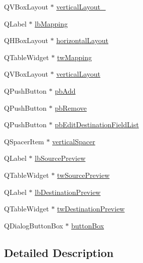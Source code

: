 \begin{DoxyCompactItemize}
\item 
Q\-V\-Box\-Layout $\ast$ \hyperlink{class_ui__mdt_field_map_dialog_ab02cee4966f301ecab7203d21905f62a}{vertical\-Layout\-\_}
\item 
Q\-Label $\ast$ \hyperlink{class_ui__mdt_field_map_dialog_aa508b425116eee11931533fb4ec7dace}{lb\-Mapping}
\item 
Q\-H\-Box\-Layout $\ast$ \hyperlink{class_ui__mdt_field_map_dialog_a833e4295c9d781adce6def558096f53d}{horizontal\-Layout}
\item 
Q\-Table\-Widget $\ast$ \hyperlink{class_ui__mdt_field_map_dialog_a75ba0e1cbf124fb09f2e0d4e90f33c27}{tw\-Mapping}
\item 
Q\-V\-Box\-Layout $\ast$ \hyperlink{class_ui__mdt_field_map_dialog_a126ba01f2e1767c734682486db335960}{vertical\-Layout}
\item 
Q\-Push\-Button $\ast$ \hyperlink{class_ui__mdt_field_map_dialog_a238f1b5debc76c3fff63e7a2b8c543d9}{pb\-Add}
\item 
Q\-Push\-Button $\ast$ \hyperlink{class_ui__mdt_field_map_dialog_a174e6dabe905ab4d0b45a24fd408ad20}{pb\-Remove}
\item 
Q\-Push\-Button $\ast$ \hyperlink{class_ui__mdt_field_map_dialog_aff6b12a8a09b3381c7910ed0d7a8e73b}{pb\-Edit\-Destination\-Field\-List}
\item 
Q\-Spacer\-Item $\ast$ \hyperlink{class_ui__mdt_field_map_dialog_a0e77e0b333f2ba3b75e1661b44c44b58}{vertical\-Spacer}
\item 
Q\-Label $\ast$ \hyperlink{class_ui__mdt_field_map_dialog_a3248ea0ebd503efd35f27776d92fc78a}{lb\-Source\-Preview}
\item 
Q\-Table\-Widget $\ast$ \hyperlink{class_ui__mdt_field_map_dialog_a4359b329034b12ab48019d873f1176f0}{tw\-Source\-Preview}
\item 
Q\-Label $\ast$ \hyperlink{class_ui__mdt_field_map_dialog_aba3f44c01ed87ecf11f384c29d20bf65}{lb\-Destination\-Preview}
\item 
Q\-Table\-Widget $\ast$ \hyperlink{class_ui__mdt_field_map_dialog_afe906fa26ad8f24ee89ddca43d00dcce}{tw\-Destination\-Preview}
\item 
Q\-Dialog\-Button\-Box $\ast$ \hyperlink{class_ui__mdt_field_map_dialog_a2ff1c455b47f9ffaea9aea9261cf97ab}{button\-Box}
\end{DoxyCompactItemize}


\subsection{Detailed Description}


